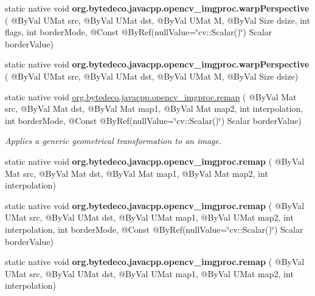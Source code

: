 \begin{DoxyCompactItemize}
static native void {\bfseries org.\+bytedeco.\+javacpp.\+opencv\+\_\+imgproc.\+warp\+Perspective} ( @By\+Val U\+Mat src, @By\+Val U\+Mat dst, @By\+Val U\+Mat M, @By\+Val Size dsize, int flags, int border\+Mode, @Const @By\+Ref(null\+Value=\char`\"{}cv\+::\+Scalar()\char`\"{}) Scalar border\+Value)
\item 
\mbox{\label{group__imgproc__transform_ga4bc0592720ed8c466f44042bcbb65481}} 
static native void {\bfseries org.\+bytedeco.\+javacpp.\+opencv\+\_\+imgproc.\+warp\+Perspective} ( @By\+Val U\+Mat src, @By\+Val U\+Mat dst, @By\+Val U\+Mat M, @By\+Val Size dsize)
\item 
static native void \hyperlink{group__imgproc__transform_gaa9d03105d426e5424af34452bee91554}{org.\+bytedeco.\+javacpp.\+opencv\+\_\+imgproc.\+remap} ( @By\+Val Mat src, @By\+Val Mat dst, @By\+Val Mat map1, @By\+Val Mat map2, int interpolation, int border\+Mode, @Const @By\+Ref(null\+Value=\char`\"{}cv\+::\+Scalar()\char`\"{}) Scalar border\+Value)
\begin{DoxyCompactList}\small\item\em Applies a generic geometrical transformation to an image. \end{DoxyCompactList}\item 
\mbox{\label{group__imgproc__transform_gaa5e9525556ee101aa0334219cf196c0e}} 
static native void {\bfseries org.\+bytedeco.\+javacpp.\+opencv\+\_\+imgproc.\+remap} ( @By\+Val Mat src, @By\+Val Mat dst, @By\+Val Mat map1, @By\+Val Mat map2, int interpolation)
\item 
\mbox{\label{group__imgproc__transform_ga6a314f42962610c53fd9e6d9fce39990}} 
static native void {\bfseries org.\+bytedeco.\+javacpp.\+opencv\+\_\+imgproc.\+remap} ( @By\+Val U\+Mat src, @By\+Val U\+Mat dst, @By\+Val U\+Mat map1, @By\+Val U\+Mat map2, int interpolation, int border\+Mode, @Const @By\+Ref(null\+Value=\char`\"{}cv\+::\+Scalar()\char`\"{}) Scalar border\+Value)
\item 
\mbox{\label{group__imgproc__transform_gae40e2fd211c9fd18d046eff7840b5181}} 
static native void {\bfseries org.\+bytedeco.\+javacpp.\+opencv\+\_\+imgproc.\+remap} ( @By\+Val U\+Mat src, @By\+Val U\+Mat dst, @By\+Val U\+Mat map1, @By\+Val U\+Mat map2, int interpolation)
\item 

\end{DoxyCompactItemize}
